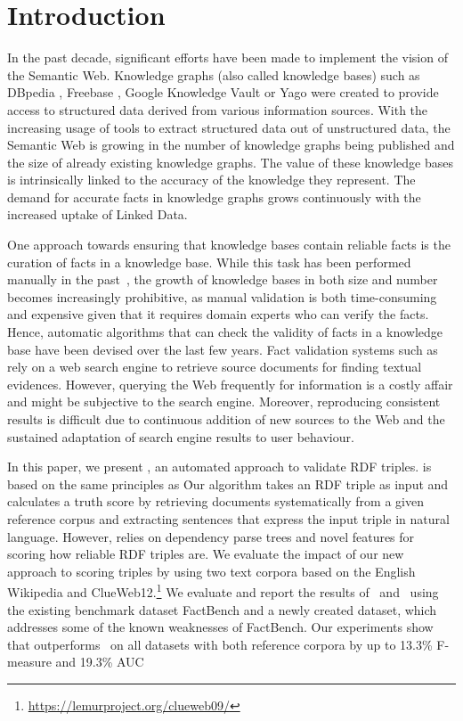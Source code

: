 \section{Introduction}

In the past decade, significant efforts have been made to implement the vision of the Semantic Web. Knowledge graphs (also called knowledge bases) such as DBpedia  \cite{lehmann2015dbpedia}, Freebase \cite{bollacker2007platform}, Google Knowledge Vault \cite{dong2014knowledge} or Yago \cite{suchanek2007yago} were created to provide access to structured data derived from various information sources. With the increasing usage of tools to extract structured data out of unstructured data, the Semantic Web is growing in the number of knowledge graphs being published and the size of already existing knowledge graphs. The value of these knowledge bases is intrinsically linked to the accuracy of the knowledge they represent. The demand for accurate facts in knowledge graphs grows continuously with the increased uptake of Linked Data.

One approach towards ensuring that knowledge bases contain reliable facts is the curation of facts in a knowledge base. While this task has been performed manually in the past~\cite{suchanek2007yago,gerber2015defacto}, the growth of knowledge bases in both size and number becomes increasingly prohibitive, as manual validation is both time-consuming and expensive given that it requires domain experts who can verify the facts. Hence, automatic algorithms that can check the validity of facts in a knowledge base have been devised over the last few years. Fact validation systems such as \DeFacto\ \cite{gerber2015defacto} rely on a web search engine to retrieve source documents for finding textual evidences. However, querying the Web frequently for information is a costly affair and might be subjective to the search engine. Moreover, reproducing consistent results is difficult due to continuous addition of new sources to the Web and the sustained adaptation of search engine results to user behaviour. 

In this paper, we present \FactCheck, an automated approach to validate RDF triples. \FactCheck is based on the same principles as \DeFacto\. Our algorithm takes an RDF triple as input and calculates a truth score by retrieving documents systematically from a given reference corpus and extracting sentences that express the input triple in natural language. However, \FactCheck{} relies on dependency parse trees and novel features for scoring how reliable RDF triples are. We evaluate the impact of our new approach to scoring triples by using two text corpora based on the English Wikipedia and ClueWeb12.\footnote{\url{https://lemurproject.org/clueweb09/}} We evaluate and report the results of \DeFacto\ and \FactCheck\ using the existing benchmark dataset FactBench \cite{gerber2015defacto} and a newly created dataset, which addresses some of the known weaknesses of FactBench. Our experiments show that %
\FactCheck{} outperforms \DeFacto\ on all datasets with both reference corpora by up to 13.3\% F-measure and 19.3\% AUC

